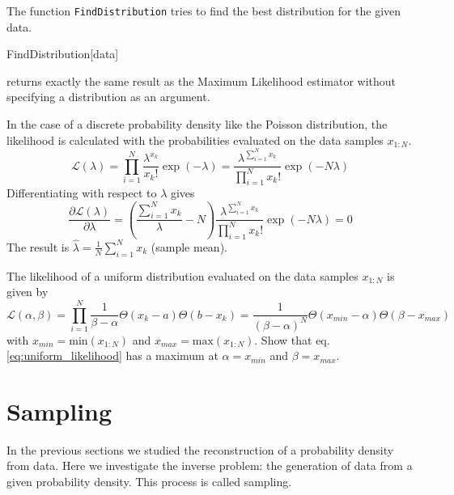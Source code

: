 \documentclass{tstextbook}
\begin{document}
The function \texttt{FindDistribution} tries to find the best distribution for the given data.
\begin{mathematica}
FindDistribution[data]
\end{mathematica}
returns exactly the same result as the Maximum Likelihood estimator without specifying a distribution as an argument.

\begin{example}
In the case of a discrete probability density like the Poisson distribution, the likelihood is calculated with the probabilities evaluated on the data samples $x_{1:N}$.
  \begin{equation}
    \mathcal{L}(\lambda) = \prod_{i=1}^N \frac{\lambda^{x_k}}{x_k!}\exp{(-\lambda)}= \frac{\lambda^{\sum_{i=1}^N x_k}}{\prod_{i=1}^N x_k!}\exp{(-N\lambda)}
  \end{equation}
Differentiating with respect to $\lambda$ gives
  \begin{equation}
    \frac{\partial\mathcal{L}(\lambda)}{\partial\lambda} = \left(\frac{\sum_{i=1}^N x_k}{\lambda} - N\right)\frac{\lambda^{\sum_{i=1}^N x_k}}{\prod_{i=1}^N x_k!} \exp{(-N\lambda)} =0
  \end{equation}
The result is $\hat{\lambda} = \frac{1}{N}\sum_{i=1}^N x_k$ (sample mean).
\end{example}


\begin{exercise}
The likelihood of a uniform distribution evaluated on the data samples $x_{1:N}$ is given by
  \begin{equation}
  \label{eq:uniform_likelihood}
    \mathcal{L}(\alpha,\beta) = \prod_{i=1}^N \frac{1}{\beta-\alpha}\Theta(x_k-a)\Theta(b-x_k)= \frac{1}{(\beta-\alpha)^N}\Theta(x_{min}-\alpha)\Theta(\beta - x_{max})
  \end{equation}
with $x_{min} = \text{min}(x_{1:N})$ and $x_{max} = \text{max}(x_{1:N})$. Show that eq. \ref{eq:uniform_likelihood} has a maximum at $\alpha = x_{min}$ and $\beta = x_{max}$.
\end{exercise}

\section{Sampling}
In the previous sections we studied the reconstruction of a probability density from data. Here we investigate the inverse problem: the generation of data from a given probability density. This process is called sampling.
\end{document}
